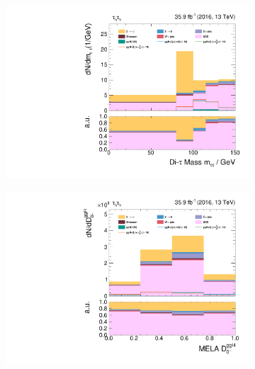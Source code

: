 \begin{figure}[h!]
    \centering
    \begin{subfigure}{.32\textwidth}
        \centering
        \includegraphics[width=\textwidth]{Figures/eventselection/tt/dijet2D_lowboost/m_sv.pdf}
    \end{subfigure}%
    \begin{subfigure}{.32\textwidth}
        \centering
        \includegraphics[width=\textwidth]{Figures/eventselection/tt/dijet2D_lowboost/melaDiscriminatorD0MinusGGH.pdf}
    \end{subfigure}%
    \begin{subfigure}{.32\textwidth}
        \centering

\end{subfigure}
\end{figure}
